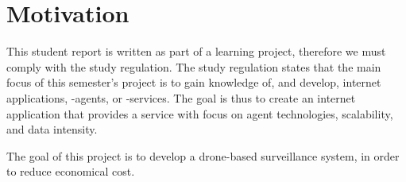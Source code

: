 \section{Motivation}
This student report is written as part of a learning project, therefore we must comply with the study regulation.
The study regulation states that the main focus of this semester's project is to gain knowledge of, and develop, internet applications, -agents, or -services.
The goal is thus to create an internet application that provides a service with focus on agent technologies, scalability, and data intensity.

The goal of this project is to develop a drone-based surveillance system, in order to reduce economical cost.